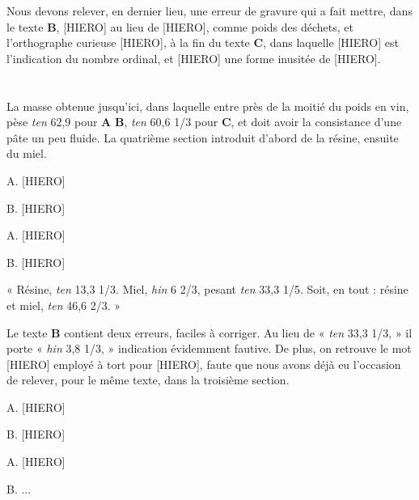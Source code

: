 \documentclass[a4paper, 11pt, oneside]{article}
\begin{document}

Nous devons relever, en dernier lieu, une erreur de gravure qui a fait mettre, dans le texte \textbf{B}, [HIERO] au lieu de [HIERO], comme poids des déchets, et l'orthographe curieuse [HIERO], à la fin du texte \textbf{C}, dans laquelle [HIERO] est l'indication du nombre ordinal, et [HIERO] une forme inusitée de [HIERO].
\clearpage
\section{}
\paragraph{}
La masse obtenue jusqu'ici, dans laquelle entre près de la moitié du poids en vin, pèse \emph{ten} 62,9 pour \textbf{A} \textbf{B}, \emph{ten} 60,6 1/3 pour \textbf{C}, et doit avoir la consistance d'une pâte un peu fluide. La quatrième section introduit d'abord de la résine, ensuite du miel.

A. [HIERO]

B. [HIERO]

A. [HIERO]

B. [HIERO]

« Résine, \emph{ten} 13,3 1/3. Miel, \emph{hin} 6 2/3, pesant \emph{ten} 33,3 1/5. Soit, en tout : résine et miel, \emph{ten} 46,6 2/3. »

Le texte \textbf{B} contient deux erreurs, faciles à corriger. Au lieu de « \emph{ten} 33,3 1/3, » il porte « \emph{hin} 3,8 1/3, » indication évidemment fautive. De plus, on retrouve le mot [HIERO] employé à tort pour [HIERO], faute que nous avons déjà eu l'occasion de relever, pour le même texte, dans la troisième section.

A. [HIERO]

B. [HIERO]

A. [HIERO]

B. ...
\end{document}
